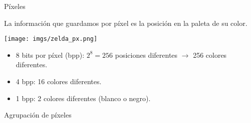 \begin{frame}{Píxeles}
    \begin{block}{}
        La información que guardamos por píxel es la posición en la paleta de su color.
    \end{block}
    {\centering\texttt{[image: imgs/zelda\_px.png]}\\}
    \begin{itemize}
        \item<2-> 8 bits por píxel (bpp): $2^8=256$ posiciones diferentes $\rightarrow$ 256 colores diferentes.
        \item<3-> 4 bpp: 16 colores diferentes.
        \item<4-> 1 bpp: 2 colores diferentes (blanco o negro).
    \end{itemize}
\end{frame}

\begin{frame}{Agrupación de píxeles}
    \centering
\end{frame}

